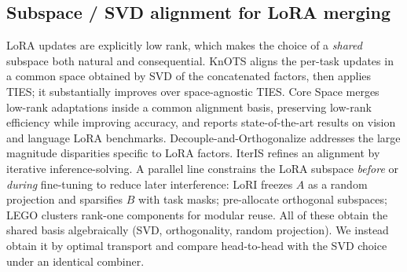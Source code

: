 \documentclass[11pt]{article}
\begin{document}
\subsection{Subspace / SVD alignment for LoRA merging}
LoRA updates are explicitly low rank, which makes the choice of a \emph{shared} subspace both natural
and consequential. KnOTS \citep{stoica2024knots} aligns the per-task updates in a common space obtained
by SVD of the concatenated factors, then applies TIES; it substantially improves over space-agnostic
TIES. Core Space \citep{panariello2025corespace} merges low-rank adaptations inside a common alignment
basis, preserving low-rank efficiency while improving accuracy, and reports state-of-the-art results on
vision and language LoRA benchmarks. Decouple-and-Orthogonalize \citep{zheng2025decouple} addresses the
large magnitude disparities specific to LoRA factors. IterIS \citep{chen2025iteris} refines an alignment
by iterative inference-solving. A parallel line constrains the LoRA subspace \emph{before} or
\emph{during} fine-tuning to reduce later interference: LoRI \citep{zhang2025lori} freezes $A$ as a
random projection and sparsifies $B$ with task masks; \citet{zhang2025unraveling} pre-allocate
orthogonal subspaces; LEGO \citep{zhao2025lego} clusters rank-one components for modular reuse. All of
these obtain the shared basis algebraically (SVD, orthogonality, random projection). We instead obtain
it by optimal transport and compare head-to-head with the SVD choice under an identical combiner.
\end{document}
